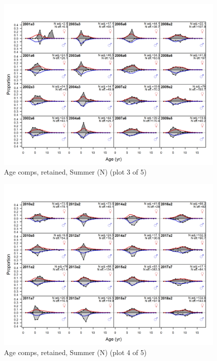 \documentclass[12pt,]{article}
\begin{document}
\begin{figure}
\centering
\includegraphics{r4ss/plots_mod1/comp_agefit_flt2mkt2_page3.png}
\caption{Age comps, retained, Summer (N) (plot 3 of 5)
\label{fig:age_fits}}
\end{figure}

\begin{figure}
\centering
\includegraphics{r4ss/plots_mod1/comp_agefit_flt2mkt2_page4.png}
\caption{Age comps, retained, Summer (N) (plot 4 of 5)
\label{fig:age_fits}}
\end{figure}
\end{document}
